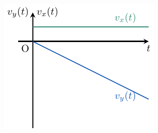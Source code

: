 \documentclass[../../main/main.tex]{subfiles}
\begin{document}
\begin{tcb*}
\begin{enumerate}[label=\sqenumi]
\begin{isd}
\begin{center}
{					      }{%
						      \includegraphics[width=\linewidth]{vo_vv_prof}
					      }%
				      \end{center}
				      \tcblower
				      \begin{center}
\end{center}
\end{isd}
\end{enumerate}
\end{tcb*}
\end{document}
